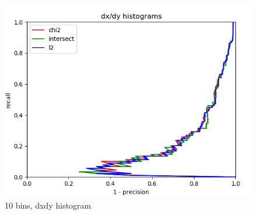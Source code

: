 \documentclass{article}
\begin{document}
\begin{figure}[ht]
\begin{minipage}{.5\textwidth}
        \includegraphics[width=\linewidth]{images/Q4.b-dxdy_histogram_10_bins.png}
        \caption{10 bins, dxdy histogram}
    \end{minipage}
\end{figure}
\end{document}
